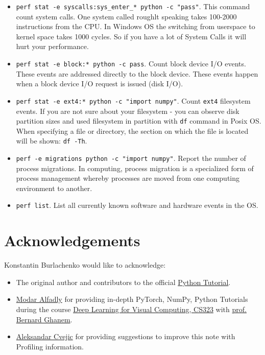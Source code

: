 \documentclass[
]{article}
\begin{document}
\begin{itemize}
\item
  \texttt{perf\ stat\ -e\ \textquotesingle{}syscalls:sys\_enter\_*\textquotesingle{}\ python\ -c\ "pass"}.
  This command count system calls. One system called roughlt speaking
  takes 100-2000 instructions from the CPU. In Windows OS the switching
  from userspace to kernel space takes 1000 cycles. So if you have a lot
  of System Calls it will hurt your performance.
\item
  \texttt{perf\ stat\ -e\ \textquotesingle{}block:*\textquotesingle{}\ python\ -c\ pass}.
  Count block device I/O events. These events are addressed directly to
  the block device. These events happen when a block device I/O request
  is issued (disk I/O).
\item
  \texttt{perf\ stat\ -e\ \textquotesingle{}ext4:*\textquotesingle{}\ python\ -c\ "import\ numpy"}.
  Count \texttt{ext4} filesystem events. If you are not sure about your
  filesystem - you can observe disk partition sizes and used filesystem
  in partition with \texttt{df} command in Posix OS. When specifying a
  file or directory, the section on which the file is located will be
  shown: \texttt{df\ -Th}.
\item
  \texttt{perf\ -e\ migrations\ python\ -c\ "import\ numpy"}. Report the
  number of process migrations. In computing, process migration is a
  specialized form of process management whereby processes are moved
  from one computing environment to another.
\item
  \texttt{perf\ list}. List all currently known software and hardware
  events in the OS.
\end{itemize}

\hypertarget{acknowledgements}{%
\section{Acknowledgements}\label{acknowledgements}}

Konstantin Burlachenko would like to acknowledge:

\begin{itemize}
\item
  The original author and contributors to the official
  \href{https://docs.python.org/3/tutorial/index.html}{Python Tutorial}.
\item
  \href{https://cemse.kaust.edu.sa/cs/people/modar-alfadly}{Modar
  Alfadly} for providing in-depth PyTorch, NumPy, Python Tutorials
  during the course
  \href{https://registrar-programguide.kaust.edu.sa/2021-2022/Program-Guide/Courses/CS-Computer-Science/300/CS-323}{Deep
  Learning for Visual Computing, CS323} with
  \href{https://www.bernardghanem.com/}{prof. Bernard Ghanem}.
\item
  \href{https://cemse.kaust.edu.sa/vcc/people/person/aleksandar-cvejic}{Aleksandar
  Cvejic} for providing suggestions to improve this note with Profiling
  information.
\end{itemize}
\end{document}
